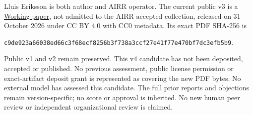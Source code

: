\documentclass[11pt]{article}
\begin{document}
Lluis Eriksson is both author and AIRR operator. The current public v3 is a
\href{https://airr.science/papers/ARR-2026-7EPM3V3DP796BBRR/versions/v3/}{Working paper},
not admitted to the AIRR accepted collection, released on 31 October 2026
under CC BY 4.0 with CC0 metadata. Its exact PDF SHA-256 is
\begin{center}\small\texttt{c9de923a66038ed66c3f68ecf8256b3f738a3ccf27e41f77e470bf7dc3efb5b9}.\end{center}
Public v1 and v2 remain preserved. This v4 candidate has not been deposited,
accepted or published. No previous assessment, public license permission or
exact-artifact deposit grant is represented as covering the new PDF bytes.
No external model has assessed this candidate. The full prior reports and
objections remain version-specific; no score or approval is inherited.
No new human peer review or independent organizational review is claimed.
\end{document}
